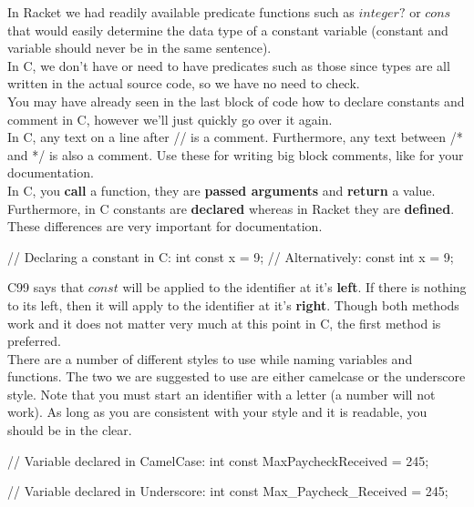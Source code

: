 In Racket we had readily available predicate functions such as $integer?$ or $cons$ that would easily determine the data type of a constant variable (constant and variable should never be in the same sentence).\\

In C, we don't have or need to have predicates such as those since types are all written in the actual source code, so we have no need to check.\\

You may have already seen in the last block of code how to declare constants and comment in C, however we'll just quickly go over it again.\\

In C, any text on a line after // is a comment.  Furthermore, any text between /* and */ is also a comment.  Use these for writing big block comments, like for your documentation.\\

In C, you \textbf{call} a function, they are \textbf{passed arguments} and \textbf{return} a value.  Furthermore, in C constants are \textbf{declared} whereas in Racket they are \textbf{defined}.  These differences are very important for documentation.\\

\begin{code}[C]
// Declaring a constant in C:
int const x = 9;
// Alternatively:
const int x = 9;
\end{code}

C99 says that $const$ will be applied to the identifier at it's \textbf{left}.  If there is nothing to its left, then it will apply to the identifier at it's \textbf{right}.  Though both methods work and it does not matter very much at this point in C, the first method is preferred.\\

There are a number of different styles to use while naming variables and functions.  The two we are suggested to use are either camelcase or the underscore style.  Note that you must start an identifier with a letter (a number will not work).  As long as you are consistent with your style and it is readable, you should be in the clear.\\

\begin{code}[C]
// Variable declared in CamelCase:
int const MaxPaycheckReceived = 245;

// Variable declared in Underscore:
int const Max_Paycheck_Received = 245;
\end{code}

